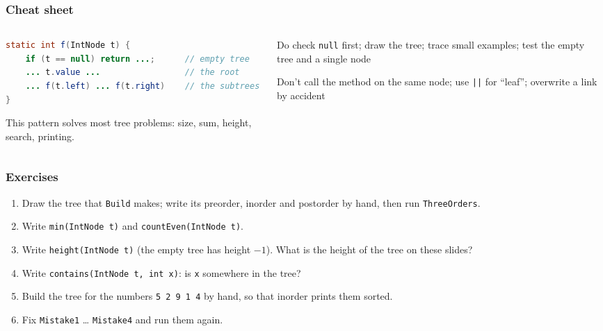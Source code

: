 \documentclass[aspectratio=169,10pt,compress]{beamer}
\begin{document}




\begin{frame}[t,fragile] \frametitle{Cheat sheet}
  \begin{columns}[T]
    \begin{column}{0.56\textwidth}


\begin{lstlisting}[style=codesnippet, language=Java, basicstyle=\ttfamily\footnotesize]
static int f(IntNode t) {
    if (t == null) return ...;      // empty tree
    ... t.value ...                 // the root
    ... f(t.left) ... f(t.right)    // the subtrees
}
\end{lstlisting}


      \small This pattern solves most tree problems: size, sum, height, search, printing.
    \end{column}
    \begin{column}{0.4\textwidth}
      \begin{block}{Do}
        \small check \texttt{null} first; draw the tree; trace small examples; test the empty tree and a single node
      \end{block}
      \begin{block}{Don't}
        \small call the method on the same node; use \texttt{||} for ``leaf''; overwrite a link by accident
      \end{block}
    \end{column}
  \end{columns}
\end{frame}




\begin{frame}[t,fragile] \frametitle{Exercises}
  \begin{enumerate}\small
    \item Draw the tree that \texttt{Build} makes; write its preorder, inorder and postorder by hand, then run \texttt{ThreeOrders}.
    \item Write \texttt{min(IntNode t)} and \texttt{countEven(IntNode t)}.
    \item Write \texttt{height(IntNode t)} (the empty tree has height $-1$). What is the height of the tree on these slides?
    \item Write \texttt{contains(IntNode t, int x)}: is \texttt{x} somewhere in the tree?
    \item Build the tree for the numbers \texttt{5 2 9 1 4} by hand, so that inorder prints them sorted.
    \item Fix \texttt{Mistake1} \dots{} \texttt{Mistake4} and run them again.
  \end{enumerate}
\end{frame}
\end{document}
